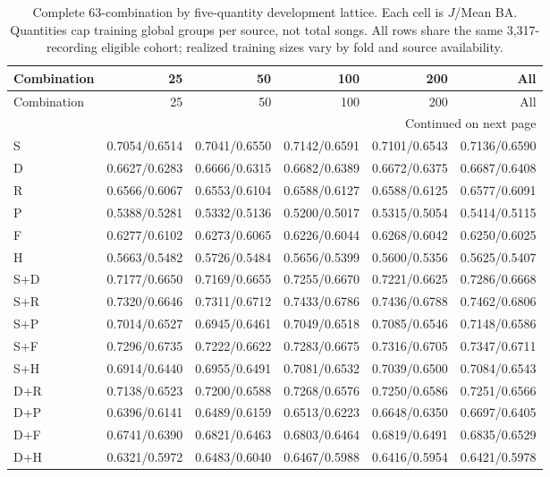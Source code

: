 \begingroup\footnotesize\setlength{\tabcolsep}{4pt}
\begin{longtable}{lrrrrr}
\caption{Complete 63-combination by five-quantity development lattice. Each cell is $J$/Mean BA. Quantities cap training global groups per source, not total songs. All rows share the same 3,317-recording eligible cohort; realized training sizes vary by fold and source availability.}\label{tab:fh30-full-lattice}\\
\toprule Combination & 25 & 50 & 100 & 200 & All \\
\midrule\endfirsthead
\toprule Combination & 25 & 50 & 100 & 200 & All \\
\midrule\endhead
\midrule\multicolumn{6}{r}{Continued on next page}\\\endfoot
\bottomrule\endlastfoot
S & 0.7054/0.6514 & 0.7041/0.6550 & 0.7142/0.6591 & 0.7101/0.6543 & 0.7136/0.6590 \\
D & 0.6627/0.6283 & 0.6666/0.6315 & 0.6682/0.6389 & 0.6672/0.6375 & 0.6687/0.6408 \\
R & 0.6566/0.6067 & 0.6553/0.6104 & 0.6588/0.6127 & 0.6588/0.6125 & 0.6577/0.6091 \\
P & 0.5388/0.5281 & 0.5332/0.5136 & 0.5200/0.5017 & 0.5315/0.5054 & 0.5414/0.5115 \\
F & 0.6277/0.6102 & 0.6273/0.6065 & 0.6226/0.6044 & 0.6268/0.6042 & 0.6250/0.6025 \\
H & 0.5663/0.5482 & 0.5726/0.5484 & 0.5656/0.5399 & 0.5600/0.5356 & 0.5625/0.5407 \\
S+D & 0.7177/0.6650 & 0.7169/0.6655 & 0.7255/0.6670 & 0.7221/0.6625 & 0.7286/0.6668 \\
S+R & 0.7320/0.6646 & 0.7311/0.6712 & 0.7433/0.6786 & 0.7436/0.6788 & 0.7462/0.6806 \\
S+P & 0.7014/0.6527 & 0.6945/0.6461 & 0.7049/0.6518 & 0.7085/0.6546 & 0.7148/0.6586 \\
S+F & 0.7296/0.6735 & 0.7222/0.6622 & 0.7283/0.6675 & 0.7316/0.6705 & 0.7347/0.6711 \\
S+H & 0.6914/0.6440 & 0.6955/0.6491 & 0.7081/0.6532 & 0.7039/0.6500 & 0.7084/0.6543 \\
D+R & 0.7138/0.6523 & 0.7200/0.6588 & 0.7268/0.6576 & 0.7250/0.6586 & 0.7251/0.6566 \\
D+P & 0.6396/0.6141 & 0.6489/0.6159 & 0.6513/0.6223 & 0.6648/0.6350 & 0.6697/0.6405 \\
D+F & 0.6741/0.6390 & 0.6821/0.6463 & 0.6803/0.6464 & 0.6819/0.6491 & 0.6835/0.6529 \\
D+H & 0.6321/0.5972 & 0.6483/0.6040 & 0.6467/0.5988 & 0.6416/0.5954 & 0.6421/0.5978 \\

\end{longtable}

